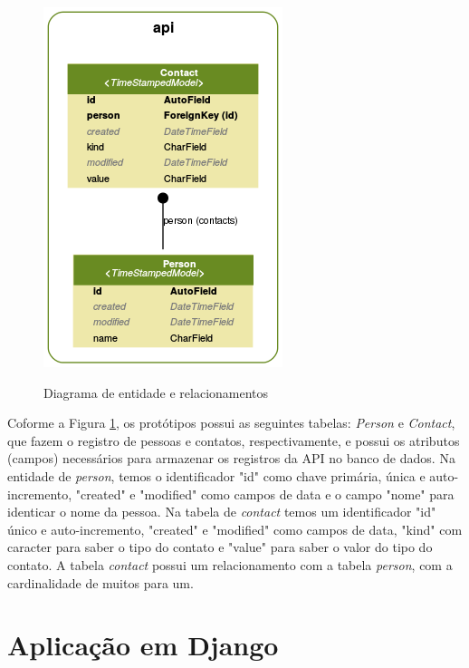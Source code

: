   \begin{figure}[H]
    \setlength{\abovecaptionskip}{0pt}
    \setlength{\belowcaptionskip}{0pt}
    \caption[Diagrama de entidade e relacionamentos]{Diagrama de entidade e relacionamentos}
    \centering
    \includegraphics[width=.55\textwidth]{imagem/der.png}
    \captionsetup{justification=centering}
    \label{fig:der}
  \end{figure}

  Coforme a Figura \ref{fig:der}, os protótipos possui as seguintes tabelas: \textit{Person} e \textit{Contact},
  que fazem o registro de pessoas e contatos, respectivamente, e possui os atributos (campos) necessários
  para armazenar os registros da API no banco de dados. Na entidade de \textit{person}, temos o identificador
  "id" como chave primária, única e auto-incremento, "created" e "modified" como campos de data e o campo
  "nome" para identicar o nome da pessoa. Na tabela de \textit{contact} temos um identificador "id" único e auto-incremento,
  "created" e "modified" como campos de data, "kind" com caracter para saber o tipo do contato e "value" para 
  saber o valor do tipo do contato. A tabela \textit{contact} possui um relacionamento com a tabela \textit{person},
  com a cardinalidade de muitos para um.

  
\section{Aplicação em Django}
\label{desenvolvimento-django}

